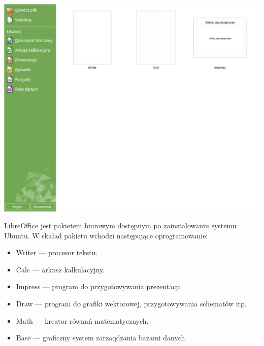 \begin{center}
	\includegraphics[width=\linewidth]{images/programy_libreoffice1.png}
\end{center}

LibreOffice jest pakietem biurowym dostępnym po zainstalowaniu systemu Ubuntu. W skaład pakietu wchodzi następujące oprogramowanie:
\begin{itemize}
\item \textcolor{ubuntu_orange}{Writer} --- procesor tekstu.
\item \textcolor{ubuntu_orange}{Calc} --- arkusz kalkulacyjny.
\item \textcolor{ubuntu_orange}{Impress} --- program do przygotowywania prezentacji.
\item \textcolor{ubuntu_orange}{Draw} --- program do grafiki wektorowej, przygotowywania schematów itp.
\item \textcolor{ubuntu_orange}{Math} --- kreator równań matematycznych.
\item \textcolor{ubuntu_orange}{Base} --- graficzny system zarzaqdzania bazami danych.
\end{itemize}